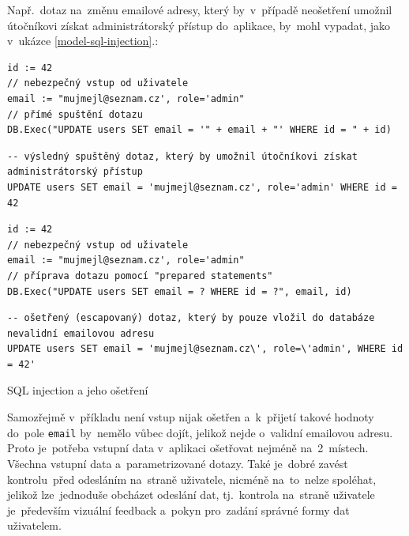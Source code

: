 \documentclass[11pt,a4paper]{report}
\let\oldacrshort\acrshort
\renewcommand{\acrshort}[1]{\emph{\normalsize\color[rgb]{0,0,0}\noindent\oldacrshort{#1}}}
\begin{document}
                Např.~dotaz na~změnu emailové adresy, který by~v~případě neošetření umožnil útočníkovi získat administrátorský přístup do~aplikace, by~mohl vypadat, jako v~ukázce \ref{model-sql-injection}.:
                \begin{code}
                    \centering
                    \begin{minipage}{0.48\textwidth}
                        \begin{verbatim}
id := 42
// nebezpečný vstup od uživatele
email := "mujmejl@seznam.cz', role='admin"
// přímé spuštění dotazu
DB.Exec("UPDATE users SET email = '" + email + "' WHERE id = " + id)
                        \end{verbatim}
                        \begin{verbatim}
-- výsledný spuštěný dotaz, který by umožnil útočníkovi získat administrátorský přístup
UPDATE users SET email = 'mujmejl@seznam.cz', role='admin' WHERE id = 42
                        \end{verbatim}
                        \subcaption{Neošetřený řetězec vložený do \acrshort{SQL}}
                    \end{minipage}
                    \begin{minipage}{0.48\textwidth}
                        \begin{verbatim}
id := 42
// nebezpečný vstup od uživatele
email := "mujmejl@seznam.cz', role='admin"
// příprava dotazu pomocí "prepared statements"
DB.Exec("UPDATE users SET email = ? WHERE id = ?", email, id)
                        \end{verbatim}
                        \begin{verbatim}
-- ošetřený (escapovaný) dotaz, který by pouze vložil do databáze nevalidní emailovou adresu
UPDATE users SET email = 'mujmejl@seznam.cz\', role=\'admin', WHERE id = 42'
                        \end{verbatim}
                    \end{minipage}
                    \caption{SQL injection a jeho ošetření}
                    \label{model-sql-injection}
                \end{code}

                Samozřejmě v~příkladu není vstup nijak ošetřen a~k~přijetí takové hodnoty do~pole \texttt{email} by~nemělo vůbec dojít, jelikož nejde o~validní emailovou adresu. Proto je~potřeba vstupní data v~aplikaci ošetřovat nejméně na~2~místech. Všechna vstupní data a~parametrizované dotazy. Také je~dobré zavést kontrolu~před odesláním na~straně uživatele, nicméně na~to~nelze spoléhat, jelikož lze~jednoduše obcházet odeslání dat, tj.~kontrola na~straně uživatele je~především vizuální feedback a~pokyn pro~zadání správné formy dat uživatelem.
                
\end{document}
